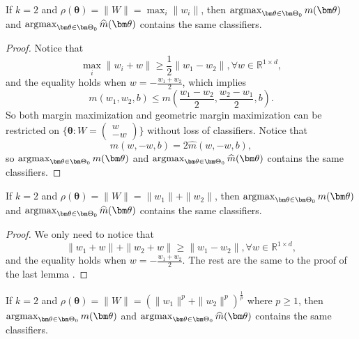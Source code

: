 \begin{lemma}
	If $k = 2$ and $\rho(\bm\theta) = \|W\| = \max_i \|w_i\|$, then $\mathop{\rm argmax}_{\bm\theta\in \bm\Theta_0} m(\bm\theta)$ and  $\mathop{\rm argmax}_{\bm\theta\in \bm\Theta_0} \widehat{m}(\bm\theta)$ contains the same classifiers.
\end{lemma}
\begin{proof}
Notice that 
\begin{equation}
	\max_i \|w_i +w\| \geq \frac{1}{2}\|w_1-w_2\|, \forall w\in \mathbb{R}^{1\times d},
\end{equation}
and the equality holds when $w = -\frac{w_1+w_2}{2}$, which implies
\begin{equation}
	m(w_1,w_2,b) \leq m(\frac{w_1-w_2}{2},\frac{w_2-w_1}{2},b).
\end{equation}
So both margin maximization and geometric margin maximization can be restricted on $\{\bm\theta: W = \begin{pmatrix}
w\\-w
\end{pmatrix}\}$ without loss of classifiers. Notice that
\[
m(w,-w,b) = 2\widehat{m}(w,-w,b),
\]
so $\mathop{\rm argmax}_{\bm\theta\in \bm\Theta_0} m(\bm\theta)$ and  $\mathop{\rm argmax}_{\bm\theta\in \bm\Theta_0} \widehat{m}(\bm\theta)$ contains the same classifiers.
\end{proof}

\begin{lemma}
	If $k = 2$ and $\rho(\bm\theta) = \|W\| = \|w_1\| + \|w_2\|$, then $\mathop{\rm argmax}_{\bm\theta\in \bm\Theta_0} m(\bm\theta)$ and  $\mathop{\rm argmax}_{\bm\theta\in \bm\Theta_0} \widehat{m}(\bm\theta)$ contains the same classifiers.
\end{lemma}

\begin{proof}
	We only need to notice that
	\begin{equation}
	\|w_1+w\| + \|w_2+w\| \geq \|w_1-w_2\|, \forall w\in \mathbb{R}^{1\times d},
	\end{equation}
	and the equality holds when $w = -\frac{w_1+w_2}{2}$. The rest are the same to the proof of the last lemma .

\end{proof}

\begin{lemma}
	If $k = 2$ and $\rho(\bm\theta) = \|W\| = (\|w_1\|^p + \|w_2\|^p)^{\frac{1}{p}}$ where $p\geq 1$, then $\mathop{\rm argmax}_{\bm\theta\in \bm\Theta_0} m(\bm\theta)$ and  $\mathop{\rm argmax}_{\bm\theta\in \bm\Theta_0} \widehat{m}(\bm\theta)$ contains the same classifiers.
\end{lemma}

